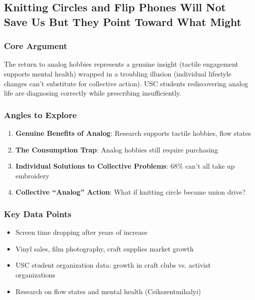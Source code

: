 \documentclass[11pt,letterpaper]{article}
\begin{document}
\newpage
\subsection{Knitting Circles and Flip Phones Will Not Save Us But They Point Toward What Might}

\subsubsection*{Core Argument}
The return to analog hobbies represents a genuine insight (tactile engagement supports mental health) wrapped in a troubling illusion (individual lifestyle changes can't substitute for collective action). USC students rediscovering analog life are diagnosing correctly while prescribing insufficiently.

\subsubsection*{Angles to Explore}
\begin{enumerate}[noitemsep]
    \item \textbf{Genuine Benefits of Analog}: Research supports tactile hobbies, flow states
    \item \textbf{The Consumption Trap}: Analog hobbies still require purchasing
    \item \textbf{Individual Solutions to Collective Problems}: 68\% can't all take up embroidery
    \item \textbf{Collective ``Analog'' Action}: What if knitting circle became union drive?
\end{enumerate}

\subsubsection*{Key Data Points}
\begin{itemize}[noitemsep]
    \item Screen time dropping after years of increase
    \item Vinyl sales, film photography, craft supplies market growth
    \item USC student organization data: growth in craft clubs vs. activist organizations
    \item Research on flow states and mental health (Csikszentmihalyi)
\end{itemize}
\end{document}
